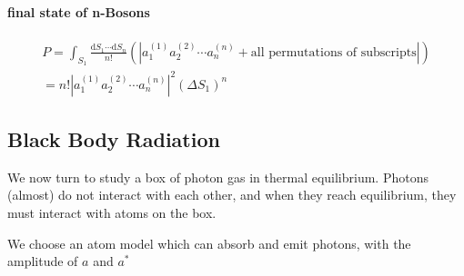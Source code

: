 \paragraph{final state of n-Bosons}
\begin{gather}
  P = \int_{S_1} \frac{\mathrm{d} S_1 \cdots \mathrm{d} S_n}{n!} \left( \left| a_{1}^{(1)} a_2^{(2)} \cdots a_n^{(n)} + \text{all permutations of subscripts}  \right|  \right) 
  \\
  = n! \left| a_1^{(1)} a_2^{(2)} \cdots a_n^{(n)} \right| ^{2} \left( \Delta S_1 \right) ^{n}
\end{gather}

\subsection[黑体辐射]{Black Body Radiation}
We now turn to study a box of photon gas in thermal equilibrium. 
Photons (almost) do not interact with each other, and when they reach equilibrium, they must interact with atoms on the box.

We choose an atom model which can absorb and emit photons, with the amplitude of $a$ and $a^{*}$